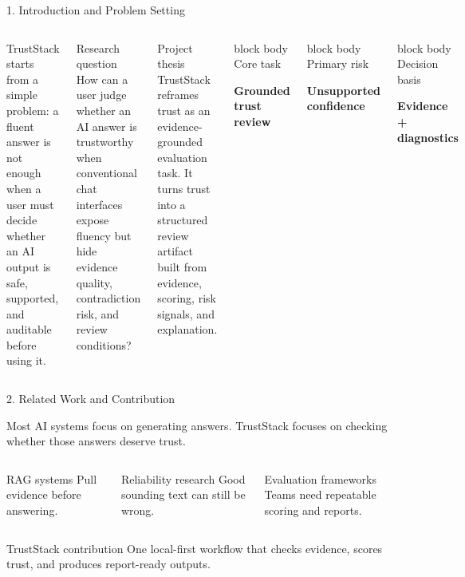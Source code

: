 \documentclass[aspectratio=169,11pt]{beamer}
\newcommand{\slidelead}[1]{%
  {\color{tsmuted}\footnotesize #1\par}
  \vspace{0.35em}
}
\newcommand{\statcard}[2]{%
  \begin{beamercolorbox}[wd=\linewidth,rounded=true,shadow=true,sep=0.18cm]{block body}
    {\scriptsize\textcolor{tsmuted}{#1}}\par
    \vspace{0.22em}
    {\large\bfseries #2}
  \end{beamercolorbox}
}
\begin{document}
\begin{frame}[shrink=8]{1. Introduction and Problem Setting}
  \vspace*{-0.28cm}
  \begin{columns}[T,totalwidth=\textwidth]
    \slidelead{TrustStack starts from a simple problem: a fluent answer is not enough when a user must decide whether an AI output is safe, supported, and auditable before using it.}
    \begin{block}{Research question}
      How can a user judge whether an AI answer is trustworthy when conventional chat interfaces expose fluency but hide evidence quality, contradiction risk, and review conditions?
    \end{block}
    \begin{block}{Project thesis}
      TrustStack reframes trust as an evidence-grounded evaluation task. It turns trust into a structured review artifact built from evidence, scoring, risk signals, and explanation.
    \end{block}
    \statcard{Core task}{Grounded trust review}
    \vspace{0.45em}
    \statcard{Primary risk}{Unsupported confidence}
    \vspace{0.45em}
    \statcard{Decision basis}{Evidence + diagnostics}
  \end{columns}
\end{frame}

\begin{frame}{2. Related Work and Contribution}
  \slidelead{Most AI systems focus on generating answers. TrustStack focuses on checking whether those answers deserve trust.}
  \begin{columns}[T,totalwidth=\textwidth]
    \begin{block}{RAG systems}
      Pull evidence before answering.
    \end{block}
    \begin{block}{Reliability research}
      Good sounding text can still be wrong.
    \end{block}
    \begin{block}{Evaluation frameworks}
      Teams need repeatable scoring and reports.
    \end{block}
  \end{columns}
  \vspace{0.6em}
  \begin{block}{TrustStack contribution}
      One local-first workflow that checks evidence, scores trust, and produces report-ready outputs.
  \end{block}
\end{frame}
\end{document}
